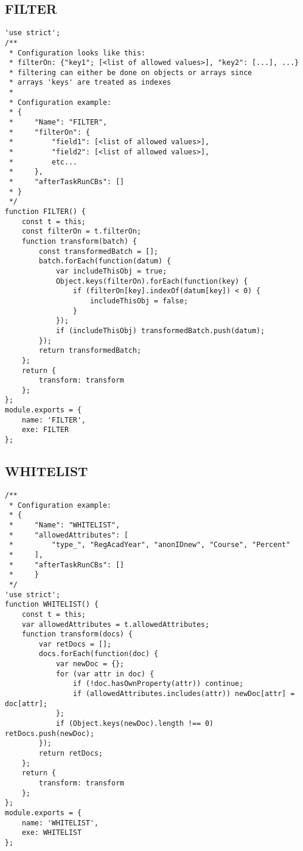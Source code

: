 \subsection{FILTER}
\label{netl-trans-filter}
\begin{verbatim}
'use strict';
/**
 * Configuration looks like this:
 * filterOn: {"key1"; [<list of allowed values>], "key2": [...], ...}
 * filtering can either be done on objects or arrays since
 * arrays 'keys' are treated as indexes
 *
 * Configuration example:
 * {
 *     "Name": "FILTER",
 *     "filterOn": {
 *         "field1": [<list of allowed values>],
 *         "field2": [<list of allowed values>],
 *         etc...
 *     },
 *     "afterTaskRunCBs": []
 * }
 */
function FILTER() {
    const t = this;
    const filterOn = t.filterOn;
    function transform(batch) {
        const transformedBatch = [];
        batch.forEach(function(datum) {
            var includeThisObj = true;
            Object.keys(filterOn).forEach(function(key) {
                if (filterOn[key].indexOf(datum[key]) < 0) {
                    includeThisObj = false;
                }
            });
            if (includeThisObj) transformedBatch.push(datum);
        });
        return transformedBatch;
    };
    return {
        transform: transform
    };
};
module.exports = {
    name: 'FILTER',
    exe: FILTER
};
\end{verbatim}

\subsection{WHITELIST}
\label{netl-trans-whitelist}
\begin{verbatim}
/**
 * Configuration example:
 * {
 *     "Name": "WHITELIST",
 *     "allowedAttributes": [
 *         "type_", "RegAcadYear", "anonIDnew", "Course", "Percent"
 *     ],
 *     "afterTaskRunCBs": []
 *     } 
 */
'use strict';
function WHITELIST() {
    const t = this;
    var allowedAttributes = t.allowedAttributes;
    function transform(docs) {
        var retDocs = [];
        docs.forEach(function(doc) {
            var newDoc = {};
            for (var attr in doc) {
                if (!doc.hasOwnProperty(attr)) continue;
                if (allowedAttributes.includes(attr)) newDoc[attr] = doc[attr];
            };
            if (Object.keys(newDoc).length !== 0) retDocs.push(newDoc);
        });
        return retDocs;
    };
    return {
        transform: transform
    };
};
module.exports = {
    name: 'WHITELIST',
    exe: WHITELIST
};
\end{verbatim}


